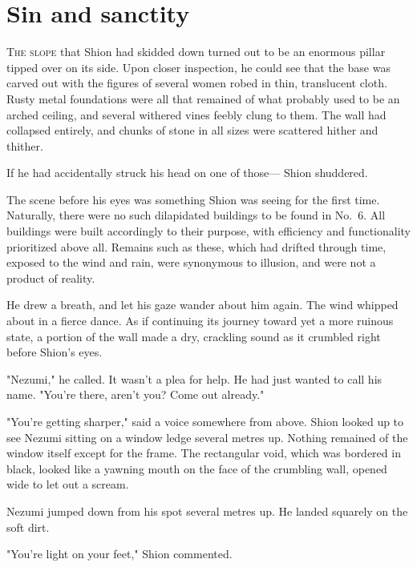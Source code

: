 
\chapter{Sin and sanctity}


\lettrine{T}{he slope} that Shion had skidded down turned out to be an enormous
pillar tipped over on its side. Upon closer inspection, he could see
that the base was carved out with the figures of several women robed in
thin, translucent cloth. Rusty metal foundations were all that remained
of what probably used to be an arched ceiling, and several withered
vines feebly clung to them. The wall had collapsed entirely, and chunks
of stone in all sizes were scattered hither and thither.

If he had accidentally struck his head on one of those--- Shion shuddered.

The scene before his eyes was something Shion was seeing for the first
time. Naturally, there were no such dilapidated buildings to be found in
No.~6. All buildings were built accordingly to their purpose, with
efficiency and functionality prioritized above all. Remains such as
these, which had drifted through time, exposed to the wind and rain,
were synonymous to illusion, and were not a product of reality.

He drew a breath, and let his gaze wander about him again. The wind
whipped about in a fierce dance. As if continuing its journey toward yet
a more ruinous state, a portion of the wall made a dry, crackling sound
as it crumbled right before Shion's eyes.

"Nezumi," he called. It wasn't a plea for help. He had just wanted to
call his name. "You're there, aren't you? Come out already."

"You're getting sharper," said a voice somewhere from above. Shion
looked up to see Nezumi sitting on a window ledge several metres up.
Nothing remained of the window itself except for the frame. The
rectangular void, which was bordered in black, looked like a yawning
mouth on the face of the crumbling wall, opened wide to let out a
scream.

Nezumi jumped down from his spot several metres up. He landed squarely
on the soft dirt.

"You're light on your feet," Shion commented.

